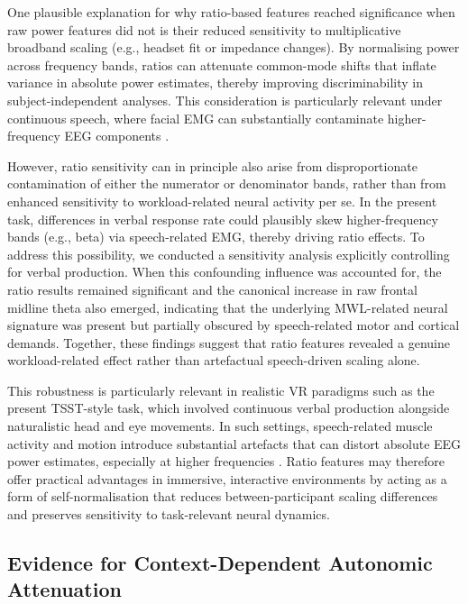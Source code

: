 \documentclass[lettersize,journal]{IEEEtran}
\begin{document}
One plausible explanation for why ratio-based features reached significance when raw power features did not is their reduced sensitivity to multiplicative broadband scaling (e.g., headset fit or impedance changes). By normalising power across frequency bands, ratios can attenuate common-mode shifts that inflate variance in absolute power estimates, thereby improving discriminability in subject-independent analyses. This consideration is particularly relevant under continuous speech, where facial EMG can substantially contaminate higher-frequency EEG components \cite{whithamScalpElectricalRecordingParalysis2007, deVosRemovalMuscleArtifactsSpokenLanguage2010}.

However, ratio sensitivity can in principle also arise from disproportionate contamination of either the numerator or denominator bands, rather than from enhanced sensitivity to workload-related neural activity per se. In the present task, differences in verbal response rate could plausibly skew higher-frequency bands (e.g., beta) via speech-related EMG, thereby driving ratio effects. To address this possibility, we conducted a sensitivity analysis explicitly controlling for verbal production. When this confounding influence was accounted for, the ratio results remained significant and the canonical increase in raw frontal midline theta also emerged, indicating that the underlying MWL-related neural signature was present but partially obscured by speech-related motor and cortical demands. Together, these findings suggest that ratio features revealed a genuine workload-related effect rather than artefactual speech-driven scaling alone.

This robustness is particularly relevant in realistic VR paradigms such as the present TSST-style task, which involved continuous verbal production alongside naturalistic head and eye movements. In such settings, speech-related muscle activity and motion introduce substantial artefacts that can distort absolute EEG power estimates, especially at higher frequencies \cite{goncharova_emg_2003, goncharovaEMGContaminationEEG2003}. Ratio features may therefore offer practical advantages in immersive, interactive environments by acting as a form of self-normalisation that reduces between-participant scaling differences and preserves sensitivity to task-relevant neural dynamics.




\subsection{Evidence for Context-Dependent Autonomic Attenuation}
\end{document}

